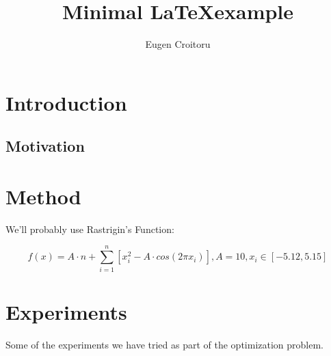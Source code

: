 \documentclass{article}
\author{Eugen Croitoru}
\title{Minimal \LaTeX example}
\begin{document}
\maketitle

\section{Introduction}
\subsection{Motivation}

\section{Method}
We'll probably use Rastrigin's Function\cite{Rastrigin}:

$$ f(x) = A \cdot n + \sum_{i=1}^n \left[ x_i^2 - A \cdot cos(2 \pi x_i) \right],
A = 10, x_i \in \left[ -5.12, 5.15 \right]$$



\section{Experiments}

Some of the experiments we have tried as part of the optimization problem.
\end{document}
